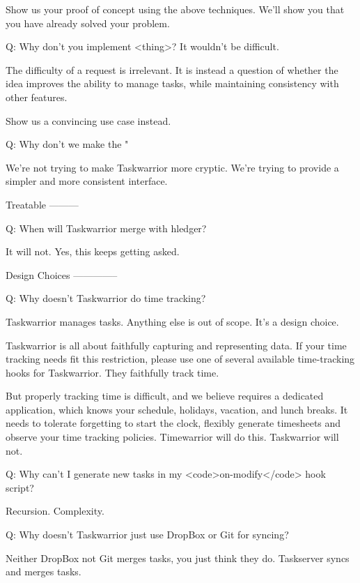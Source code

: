 \documentclass[t,handout]{beamer}
\begin{document}
    Show us your proof of concept using the above techniques. We'll show you that you have already solved your problem.

Q: Why don't you implement <thing>? It wouldn't be difficult.

    The difficulty of a request is irrelevant. It is instead a question of whether the idea improves the ability to manage tasks, while maintaining consistency with other features.

    Show us a convincing use case instead.

Q: Why don't we make the "%

    We're not trying to make Taskwarrior more cryptic. We're trying to provide a simpler and more consistent interface.

Treatable
---------

Q: When will Taskwarrior merge with hledger?

    It will not. Yes, this keeps getting asked.

Design Choices
--------------

Q: Why doesn't Taskwarrior do time tracking?

    Taskwarrior manages tasks. Anything else is out of scope. It's a design choice.

    Taskwarrior is all about faithfully capturing and representing data. If your time tracking needs fit this restriction, please use one of several available time-tracking hooks for Taskwarrior. They faithfully track time.

    But properly tracking time is difficult, and we believe requires a dedicated application, which knows your schedule, holidays, vacation, and lunch breaks. It needs to tolerate forgetting to start the clock, flexibly generate timesheets and observe your time tracking policies. Timewarrior will do this. Taskwarrior will not.

Q: Why can't I generate new tasks in my <code>on-modify</code> hook script?

    Recursion. Complexity.

Q: Why doesn't Taskwarrior just use DropBox or Git for syncing?

    Neither DropBox not Git merges tasks, you just think they do. Taskserver syncs and merges tasks.

\fi
\end{document}
